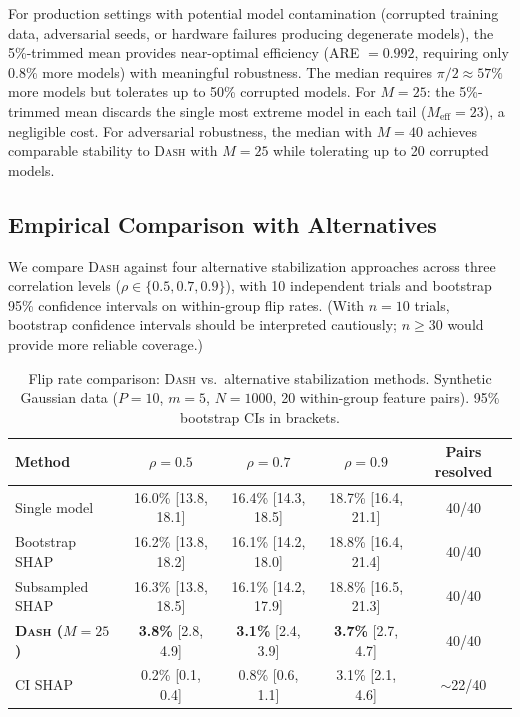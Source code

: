 \documentclass{jmlr}
\newcommand{\DASH}{\textsc{Dash}}
\begin{document}
For production settings with potential model contamination (corrupted training data, adversarial seeds, or hardware failures producing degenerate models), the 5\%-trimmed mean provides near-optimal efficiency (ARE $= 0.992$, requiring only $0.8\%$ more models) with meaningful robustness. The median requires $\pi/2 \approx 57\%$ more models but tolerates up to 50\% corrupted models. For $M = 25$: the 5\%-trimmed mean discards the single most extreme model in each tail ($M_{\text{eff}} = 23$), a negligible cost. For adversarial robustness, the median with $M = 40$ achieves comparable stability to \DASH{} with $M = 25$ while tolerating up to 20 corrupted models.

\subsection{Empirical Comparison with Alternatives}
\label{sec:dash-benchmark}

We compare \DASH{} against four alternative stabilization approaches across three correlation levels ($\rho \in \{0.5, 0.7, 0.9\}$), with 10 independent trials and bootstrap 95\% confidence intervals on within-group flip rates. (With $n=10$ trials, bootstrap confidence intervals should be interpreted cautiously; $n \geq 30$ would provide more reliable coverage.)

\begin{table}[t]
\centering
\caption{Flip rate comparison: \DASH{} vs.\ alternative stabilization methods. Synthetic Gaussian data ($P{=}10$, $m{=}5$, $N{=}1000$, 20 within-group feature pairs). 95\% bootstrap CIs in brackets.}
\label{tab:dash-benchmark}
\small
\begin{tabular}{@{}lcccc@{}}
\toprule
Method & $\rho = 0.5$ & $\rho = 0.7$ & $\rho = 0.9$ & Pairs resolved \\
\midrule
Single model       & 16.0\% [13.8, 18.1] & 16.4\% [14.3, 18.5] & 18.7\% [16.4, 21.1] & 40/40 \\
Bootstrap SHAP     & 16.2\% [13.8, 18.2] & 16.1\% [14.2, 18.0] & 18.8\% [16.4, 21.4] & 40/40 \\
Subsampled SHAP    & 16.3\% [13.8, 18.5] & 16.1\% [14.2, 17.9] & 18.8\% [16.5, 21.3]  & 40/40 \\
\textbf{\DASH{} ($M{=}25$)} & \textbf{3.8\%} [2.8, 4.9] & \textbf{3.1\%} [2.4, 3.9] & \textbf{3.7\%} [2.7, 4.7] & 40/40 \\
CI SHAP            & 0.2\% [0.1, 0.4]    & 0.8\% [0.6, 1.1]    & 3.1\% [2.1, 4.6]     & $\sim$22/40 \\
\bottomrule
\end{tabular}
\end{table}
\end{document}
